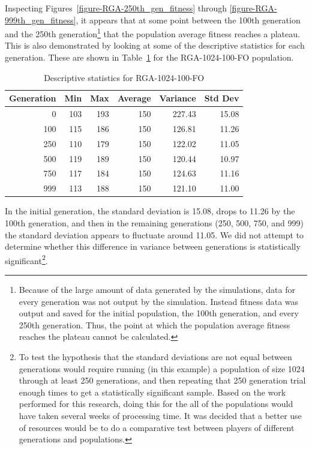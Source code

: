 Inspecting Figures~\ref{figure-RGA-250th_gen_fitness} through
\ref{figure-RGA-999th_gen_fitness}, it appears that at some point between the
100th generation and the 250th generation\footnote{Because of the large amount
of data generated by the simulations, data for every generation was not output
by the simulation. Instead fitness data was output and saved for the initial
population, the 100th generation, and every 250th generation. Thus, the point at
which the population average fitness reaches the plateau cannot be calculated.}
that the population average fitness reaches a plateau. This is also demonstrated
by looking at some of the descriptive statistics for each generation. These are
shown in Table~\ref{table-stats-for-s1024-n100-fo} for the RGA-1024-100-FO
population.

\begin{table}[ht]
\begin{center}
\caption[RGA-1024-100-FO statistics]{Descriptive statistics for RGA-1024-100-FO}
\begin{tabular}{ | r || r | r | r | r | r |}
\hline
Generation & Min & Max & Average & Variance & Std Dev \\ \hline \hline
0   & 103 & 193 & 150 & 227.43 & 15.08 \\ \hline
100 & 115 & 186 & 150 & 126.81 & 11.26 \\ \hline
250 & 110 & 179 & 150 & 122.02 & 11.05 \\ \hline
500 & 119 & 189 & 150 & 120.44 & 10.97 \\ \hline
750 & 117 & 184 & 150 & 124.63 & 11.16 \\ \hline
999 & 113 & 188 & 150 & 121.10 & 11.00 \\ \hline
\end{tabular}
\label{table-stats-for-s1024-n100-fo}
\end{center}
\end{table}

In the initial generation, the standard deviation is 15.08, drops to 11.26 by
the 100th generation, and then in the remaining generations (250, 500, 750, and
999) the standard deviation appears to fluctuate around 11.05. We did not
attempt to determine whether this difference in variance between generations is
statistically significant\footnote{To test the hypothesis that the standard
deviations are not equal between generations would require running (in this
example) a population of size 1024 through at least 250 generations, and then
repeating that 250 generation trial enough times to get a statistically
significant sample. Based on the work performed for this research, doing this
for the all of the populations would have taken several weeks of processing
time. It was decided that a better use of resources would be to do a comparative
test between players of different generations and populations.}.

